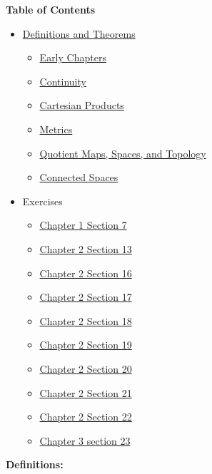 \documentclass[12pt,letterpaper]{article}
\begin{document}
\RaggedRight
\textbf{Table of Contents}
\begin{itemize}
  \item[] \hyperref[sec:Definitions]{Definitions and Theorems}
  \begin{itemize}
    \item[] \hyperref[sec:EarlyChapters]{Early Chapters}
    \item[] \hyperref[sec:continuity]{Continuity}
    \item[] \hyperref[dfn:cartesianProducts]{Cartesian Products}
    \item[] \hyperref[dfn:metric]{Metrics}
    \item[] \hyperref[dfn:quotientMapTopology]{Quotient Maps, Spaces, and Topology}
    \item[] \hyperref[sec:connectedness]{Connected Spaces}
  \end{itemize}
  \item[]  Exercises
  \begin{itemize}
    \item[] \hyperref[sec:chapter1.7]{Chapter 1 Section 7}
    \item[] \hyperref[sec:chapter2.13]{Chapter 2 Section 13}
    \item[] \hyperref[sec:chapter2.16]{Chapter 2 Section 16}
    \item[] \hyperref[sec:chapter2.17]{Chapter 2 Section 17}
    \item[] \hyperref[sec:chapter2.18]{Chapter 2 Section 18}
    \item[] \hyperref[sec:chapter2.19]{Chapter 2 Section 19}
    \item[] \hyperref[sec:chapter2.20]{Chapter 2 Section 20}
    \item[] \hyperref[sec:chapter2.21]{Chapter 2 Section 21}
    \item[] \hyperref[sec:chapter2.22]{Chapter 2 Section 22}
    \item[] \hyperref[sec:chapter3.23]{Chapter 3 section 23}
  \end{itemize}
\end{itemize}
\noindent \textbf{Definitions:} \label{sec:Definitions}
\end{document}
